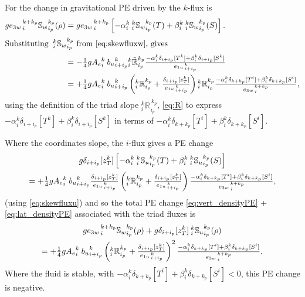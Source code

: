 \documentclass[../main/NEMO_manual]{subfiles}
\newcommand{\triad}[6][]{\ensuremath{{}_{#2}^{#3}{\mathbb{#4}_{#1}}_{#5}^{\,#6}}}
\newcommand{\triadt}[5]{\ensuremath{{}_{#1}^{#2}{\tilde{\mathbb{#3}}}_{#4}^{\,#5}}}
\newcommand{\rtriad}[2][]{\ensuremath{\triad[#1]{i}{k}{#2}{i_p}{k_p}}}
\newcommand{\rtriadt}[1]{\ensuremath{\triadt{i}{k}{#1}{i_p}{k_p}}}
\begin{document}
For the change in gravitational PE driven by the $k$-flux is
\begin{align}
  \label{eq:vert_densityPE}
  g {e_{3w}}_{\,i}^{\,k+k_p}{\mathbb{S}_w}_{i_p}^{k_p} (\rho)
  &=g {e_{3w}}_{\,i}^{\,k+k_p}\left[-\alpha _i^k {\:}_i^k
    {\mathbb{S}_w}_{i_p}^{k_p} (T) + \beta_i^k {\:}_i^k
    {\mathbb{S}_w}_{i_p}^{k_p} (S) \right]. \notag \\
  \intertext{Substituting  ${\:}_i^k {\mathbb{S}_w}_{i_p}^{k_p}$ from \autoref{eq:skewfluxw}, gives}
  &=-\fractext{1}{4} g{A_e}_i^k{\: }{b_u}_{i+i_p}^k {_i^k\tilde{\mathbb{R}}_{i_p}^{k_p}}
    \frac{ -\alpha _i^k\delta_{i+ i_p}[T^k]+ \beta_i^k\delta_{i+ i_p}[S^k]} { {e_{1u}}_{\,i + i_p}^{\,k} } \notag \\
  &=+\fractext{1}{4} g{A_e}_i^k{\: }{b_u}_{i+i_p}^k
    \left({_i^k\mathbb{R}_{i_p}^{k_p}}+\frac{\delta_{i+i_p}[z_T^k]}{{e_{1u}}_{\,i + i_p}^{\,k}}\right) {_i^k\mathbb{R}_{i_p}^{k_p}}
    \frac{-\alpha_i^k \delta_{k+ k_p}[T^i]+ \beta_i^k\delta_{k+ k_p}[S^i]} {{e_{3w}}_{\,i}^{\,k+k_p}},
\end{align}
using the definition of the triad slope $\rtriad{R}$, \autoref{eq:R} to
express $-\alpha _i^k\delta_{i+ i_p}[T^k]+\beta_i^k\delta_{i+ i_p}[S^k]$ in terms of
$-\alpha_i^k \delta_{k+ k_p}[T^i]+ \beta_i^k\delta_{k+ k_p}[S^i]$.

Where the coordinates slope, the $i$-flux gives a PE change
\begin{multline}
  \label{eq:lat_densityPE}
  g \delta_{i+i_p}[z_T^k]
  \left[
    -\alpha _i^k {\:}_i^k {\mathbb{S}_u}_{i_p}^{k_p} (T) + \beta_i^k {\:}_i^k {\mathbb{S}_u}_{i_p}^{k_p} (S)
  \right] \\
  = +\textstyle \frac{1}{4} g{A_e}_i^k{\: }{b_u}_{i+i_p}^k
  \frac{\delta_{i+i_p}[z_T^k]}{{e_{1u}}_{\,i + i_p}^{\,k}}
  \left({_i^k\mathbb{R}_{i_p}^{k_p}}+\frac{\delta_{i+i_p}[z_T^k]}{{e_{1u}}_{\,i + i_p}^{\,k}}\right)
  \frac{-\alpha_i^k \delta_{k+ k_p}[T^i]+ \beta_i^k\delta_{k+ k_p}[S^i]} {{e_{3w}}_{\,i}^{\,k+k_p}},
\end{multline}
(using \autoref{eq:skewfluxu}) and so the total PE change \autoref{eq:vert_densityPE} +
\autoref{eq:lat_densityPE} associated with the triad fluxes is
\begin{multline*}
  g{e_{3w}}_{\,i}^{\,k+k_p}{\mathbb{S}_w}_{i_p}^{k_p} (\rho) +
  g\delta_{i+i_p}[z_T^k] {\:}_i^k {\mathbb{S}_u}_{i_p}^{k_p} (\rho) \\
  = +\textstyle \frac{1}{4} g{A_e}_i^k{\: }{b_u}_{i+i_p}^k
  \left({_i^k\mathbb{R}_{i_p}^{k_p}}+\frac{\delta_{i+i_p}[z_T^k]}{{e_{1u}}_{\,i + i_p}^{\,k}}\right)^2
  \frac{-\alpha_i^k \delta_{k+ k_p}[T^i]+ \beta_i^k\delta_{k+ k_p}[S^i]} {{e_{3w}}_{\,i}^{\,k+k_p}}.
\end{multline*}
Where the fluid is stable, with $-\alpha_i^k \delta_{k+ k_p}[T^i]+
\beta_i^k\delta_{k+ k_p}[S^i]<0$, this PE change is negative.
\end{document}
